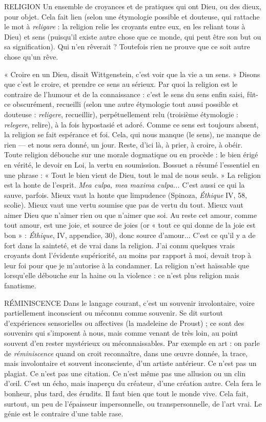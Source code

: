 RELIGION Un ensemble de croyances et de pratiques qui ont Dieu, ou des
dieux, pour objet. Cela fait lien (selon une étymologie possible
et douteuse, qui rattache le mot à {\it religare} : la religion relie les croyants entre
eux, en les reliant tous à Dieu) et sens (puisqu'il existe autre chose que ce
monde, qui peut être son but ou sa signification). Qui n’en rêverait ? Toutefois
rien ne prouve que ce soit autre chose qu’un rêve.

« Croire en un Dieu, disait Wittgenstein, c’est voir que la vie a un sens. »
Disons que c’est le croire, et prendre ce sens au sérieux. Par quoi la religion est
le contraire de l'humour et de la connaissance : c’est le sens du sens enfin saisi,
fût-ce obscurément, recueilli (selon une autre étymologie tout aussi possible et
douteuse : {\it religere}, recueillir), perpétuellement relu (troisième étymologie :
{\it relegere}, relire), à la fois hypostasié et adoré. Comme ce sens est toujours absent,
la religion se fait espérance et foi. Cela, qui nous manque (le sens), ne manque
de rien — et nous sera donné, un jour. Reste, d’ici là, à prier, à croire, à obéir.
Toute religion débouche sur une morale dogmatique ou en procède : le bien
érigé en vérité, le devoir en Loi, la vertu en soumission. Bossuet a résumé
l'essentiel en une phrase : « Tout le bien vient de Dieu, tout le mal de nous
seuls. » La religion est la honte de l'esprit. {\it Mea culpa, mea maxima culpa...}
C’est aussi ce qui la sauve, parfois. Mieux vaut la honte que limpudence (Spinoza,
{\it Éthique} IV, 58, scolie). Mieux vaut une vertu soumise que pas de vertu
du tout. Mieux vaut aimer Dieu que n’aimer rien ou que n’aimer que soi. Au
reste cet amour, comme tout amour, est une joie, et source de joies (or « tout
ce qui donne de la joie est bon » : {\it Éthique}, IV, appendice, 30), donc source
d'amour... C’est ce qu’il y a de fort dans la sainteté, et de vrai dans la religion.
J'ai connu quelques vrais croyants dont l’évidente supériorité, au moins par
rapport à moi, devait trop à leur foi pour que je m’autorise à la condamner. La
religion n’est haïssable que lorsqu'elle débouche sur la haine ou la violence : ce
n'est plus religion mais fanatisme.

RÉMINISCENCE Dans le langage courant, c’est un souvenir involontaire,
voire partiellement inconscient ou méconnu comme
souvenir. Se dit surtout d’expériences sensorielles ou affectives (la madeleine de
Proust) ; ce sont des souvenirs qui s'imposent à nous, mais comme venant de
très loin, au point souvent d’en rester mystérieux ou méconnaissables. Par
exemple en art : on parle de {\it réminiscence} quand on croit reconnaître, dans une
œuvre donnée, la trace, mais involontaire et souvent inconsciente, d’un artiste
antérieur. Ce n'est pas un plagiat. Ce n’est pas une citation. Ce n’est même pas
une allusion ou un clin d’œil. C’est un écho, mais inaperçu du créateur, d’une
création autre. Cela fera le bonheur, plus tard, des érudits. Il faut bien que tout
le monde vive. Cela fait, surtout, un peu de l'épaisseur impersonnelle, ou transpersonnelle,
de l’art vrai. Le génie est le contraire d’une table rase.

